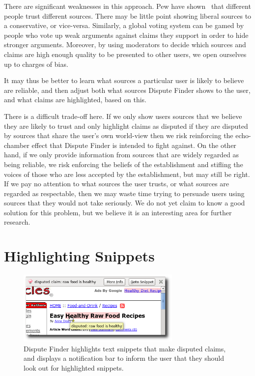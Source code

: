 \documentclass{www2010-submission}
\newcommand{\todo}[1]{}
\begin{document}
\todo{study result: verify}
There are significant weaknesses in this approach. Pew have shown~\cite{pew-news} that different people trust different sources. There may be little point showing liberal sources to a conservative, or vice-versa. Similarly, a global voting system can be gamed by people who vote up weak arguments against claims they support in order to hide stronger arguments. Moreover, by using moderators to decide which sources and claims are high enough quality to be presented to other users, we open ourselves up to charges of bias.

It may thus be better to learn what sources a particular user is likely to believe are reliable, and then adjust both what sources Dispute Finder shows to the user, and what claims are highlighted, based on this.

There is a difficult trade-off here. If we only show users sources that we believe they are likely to trust and only highlight claims as disputed if they are disputed by sources that share the user's own world-view then we risk reinforcing the echo-chamber effect that Dispute Finder is intended to fight against. On the other hand, if we only provide information from sources that are widely regarded as being reliable, we risk enforcing the beliefs of the establishment and stifling the voices of those who are less accepted by the establishment, but may still be right. If we pay no attention to what sources the user trusts, or what sources are regarded as respectable, then we may waste time trying to persuade users using sources that they would not take seriously. We do not yet claim to know a good solution for this problem, but we believe it is an interesting area for further research.

\todo{Cite Pew Research study saying people like to read news that supports their own point of view, but many others like neutral sources. http://people-press.org/report/?pageid=1353}


\section{Highlighting Snippets}

\begin{figure}[tb]
	\begin{center}
	\includegraphics[width=8cm]{pictures/highlight_bar.png}
	\caption{Dispute Finder highlights text snippets that make disputed claims, and displays a notification bar to inform the user that they should look out for highlighted snippets.}
	\label{highlight_bar}
	\end{center}
\end{figure}
\end{document}
